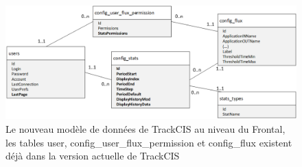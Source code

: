 			\begin{figure}[H]
				\centering
				\includegraphics[width=16cm]{../img/part3/modele_donnee.png}
				\caption{\label{modele_donnee} Le nouveau modèle de données de TrackCIS au
				niveau du Frontal, les tables user, config\_user\_flux\_permission et
				config\_flux existent déjà dans la version actuelle de TrackCIS}
			\end{figure}
			
